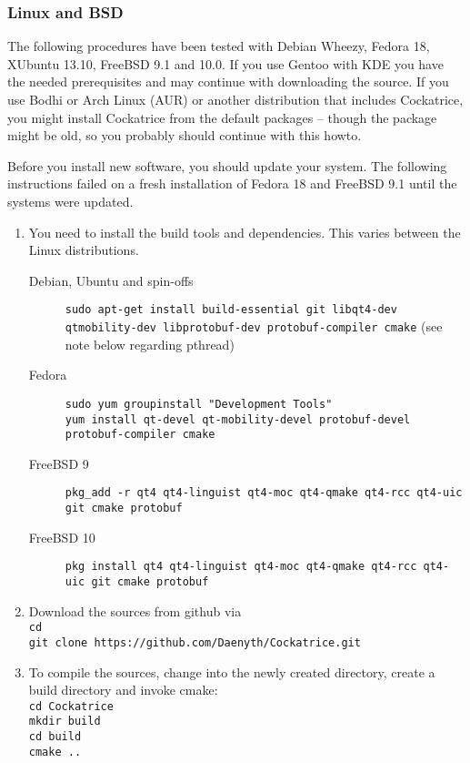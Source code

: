 \documentclass[a4paper]{scrbook}
\newcommand{\shellcmd}[1]{\texttt{\scriptsize #1}}
\begin{document}
\subsubsection{Linux and BSD}
The following procedures have been tested with Debian Wheezy, Fedora 18, XUbuntu 13.10, FreeBSD 9.1 and 10.0.
If you use Gentoo with KDE you have the needed prerequisites and may continue with downloading the source.
If you use Bodhi or Arch Linux (AUR) or another distribution that includes Cockatrice, you might install Cockatrice from the default packages -- though the package might be old, 
so you probably should continue with this howto.

Before you install new software, you should update your system. The following instructions failed on a fresh installation of Fedora 18 and FreeBSD 9.1 until the systems were updated.
\begin{enumerate}
 \item You need to install the build tools and dependencies. This varies between the Linux distributions.
 \begin{description}
  \item[Debian, Ubuntu and spin-offs] \shellcmd{sudo apt-get install build-essential git libqt4-dev qtmobility-dev libprotobuf-dev protobuf-compiler cmake} (see note below regarding pthread)
  \item[Fedora] \shellcmd{sudo yum groupinstall "Development Tools"\\
  yum install qt-devel qt-mobility-devel protobuf-devel protobuf-compiler cmake}
  \item[FreeBSD 9] \shellcmd{pkg\_add -r qt4 qt4-linguist qt4-moc qt4-qmake qt4-rcc qt4-uic git cmake protobuf}
  \item[FreeBSD 10] \shellcmd{pkg install qt4 qt4-linguist qt4-moc qt4-qmake qt4-rcc qt4-uic git cmake protobuf}
 \end{description}
 \item Download the sources from github via \\ \shellcmd{cd\\ git clone https://github.com/Daenyth/Cockatrice.git}
 \item To compile the sources, change into the newly created directory, create a build directory and invoke cmake:\\
 \shellcmd{cd Cockatrice \\
mkdir build \\
cd build \\
cmake ..\\
}
\end{enumerate}
\end{document}
